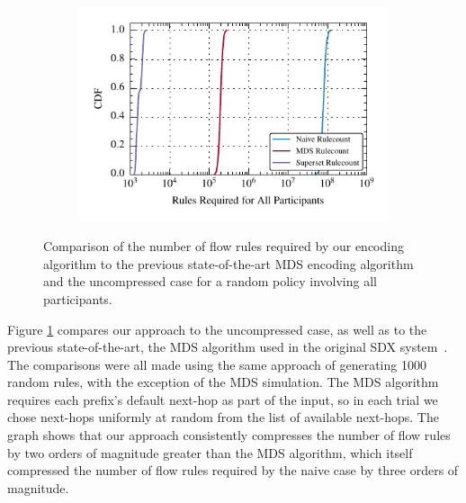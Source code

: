 \begin{figure}[t!] 
\begin{minipage}{1\linewidth}
\begin{subfigure}[b]{0.96\linewidth}
\includegraphics[width=\linewidth]{figures/comparison_cdf}
\end{subfigure} 
\end{minipage} 
\caption{Comparison of the number of flow rules required by our encoding algorithm to the previous state-of-the-art MDS encoding algorithm and the uncompressed case for a random policy involving all participants.}
\label{fig:comparison}
\end{figure}


Figure \ref{fig:comparison} compares our approach to the uncompressed case, as well as to the previous state-of-the-art, the MDS algorithm used in the original SDX system~\cite{sdx}. The comparisons were all made using the same approach of generating 1000 random rules, with the exception of the MDS simulation. The MDS algorithm requires each prefix's default next-hop as part of the input, so in each trial we chose next-hops uniformly at random from the list of available next-hops. The graph shows that our approach consistently compresses the number of flow rules by two orders of magnitude greater than the MDS algorithm, which itself compressed the number of flow rules required by the naive case by three orders of magnitude. 

